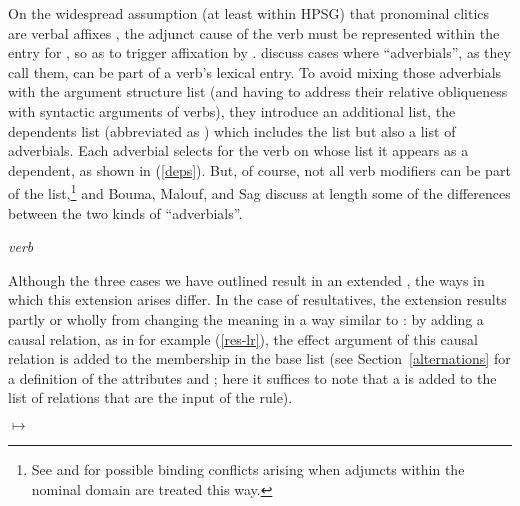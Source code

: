 \documentclass[output=paper
 	        ,biblatex
                ,babelshorthands
                ,newtxmath
                ,draftmode
                ,colorlinks, citecolor=brown
]{langscibook}
\begin{document}
\noindent
On the widespread assumption (at least within HPSG) that pronominal clitics are verbal affixes \citep{MillerandSag1997}, the adjunct cause of the verb  must be represented within the entry for , so as to trigger affixation by . \citet{Boumaetal2001} discuss cases where ``adverbials'', as they call them, can be part of a verb's lexical entry. To avoid mixing those adverbials with the argument structure list (and having to address their relative obliqueness with syntactic arguments of verbs), they introduce  an additional list, the dependents list (abbreviated as \deps) which includes the \argst list but also a list of adverbials. Each adverbial selects for the verb on whose \deps list it appears as a dependent, as shown in (\ref{deps}). But, of course, not all verb modifiers can be part of the \deps list,\footnote{%
See  and  for possible binding conflicts arising when adjuncts within the nominal domain are treated this way.
} and Bouma, Malouf, and Sag discuss at length some of the differences between the two kinds of ``adverbials''.

\begin{exe}
\ex\label{deps}
\emph{verb} \impl
{}
\end{exe}

Although the three cases we have outlined result in an extended \argst, the ways in which this extension arises differ. In the case of resultatives, the extension results partly or wholly from changing the meaning in a way similar to \citet{RappaportandLevin1998}: by adding a causal relation, as in for example (\ref{res-lr}), the effect argument of this causal relation is added to the membership in the base \argst list (see Section~\ref{alternations} for a definition of the attributes  and ; here it suffices to note that a  is added to the list of relations that are the input of the rule). 

\begin{exe}
\ex\label{res-lr}

	$\mapsto$
\end{exe}
\end{document}
